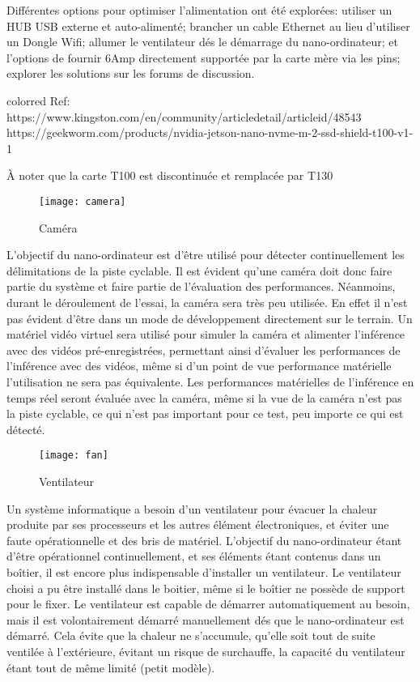 \par Différentes options pour optimiser l'alimentation ont été explorées: utiliser un HUB USB externe et auto-alimenté; brancher un cable Ethernet au lieu d'utiliser un Dongle Wifi; allumer le ventilateur dés le démarrage du nano-ordinateur; et l'options de fournir 6Amp directement supportée par la carte mère via les pins; explorer les solutions sur les forums de discussion. 
{color{red}
Ref: https://www.kingston.com/en/community/articledetail/articleid/48543
https://geekworm.com/products/nvidia-jetson-nano-nvme-m-2-ssd-shield-t100-v1-1
\par À noter que la carte T100 est discontinuée et remplacée par T130
}
\begin{figure}[H]
    \centering
    \texttt{[image: camera]}
    \caption{Caméra}
    \label{fig:camera}
\end{figure}
\par L'objectif du nano-ordinateur est d'être utilisé pour détecter continuellement les délimitations de la piste cyclable. Il est évident qu'une caméra doit donc faire partie du système et faire partie de l'évaluation des performances. Néanmoins, durant le déroulement de l'essai, la caméra sera très peu utilisée. En effet il n'est pas évident d'être dans un mode de développement directement sur le terrain. Un matériel vidéo virtuel sera utilisé pour simuler la caméra et alimenter l'inférence avec des vidéos pré-enregistrées, permettant ainsi d'évaluer les performances de l'inférence avec des vidéos, même si d'un point de vue performance matérielle l'utilisation ne sera pas équivalente. Les performances matérielles de l'inférence en temps réel seront évaluée avec la caméra, même si la vue de la caméra n'est pas la piste cyclable, ce qui n'est pas important pour ce test, peu importe ce qui est détecté.
\begin{figure}[H]
    \centering
    \texttt{[image: fan]}
    \caption{Ventilateur}
    \label{fig:fan}
\end{figure}
\par Un système informatique a besoin d'un ventilateur pour évacuer la chaleur produite par ses processeurs et les autres élément électroniques, et éviter une faute opérationnelle et des bris de matériel. L'objectif du nano-ordinateur étant d'être opérationnel continuellement, et ses éléments étant contenus dans un boîtier, il est encore plus indispensable d'installer un ventilateur. Le ventilateur choisi a pu être installé dans le boitier, même si le boîtier ne possède de support pour le fixer. Le ventilateur est capable de démarrer automatiquement au besoin, mais il est volontairement démarré manuellement dés que le nano-ordinateur est démarré. Cela évite que la chaleur ne s'accumule, qu'elle soit tout de suite ventilée à l'extérieure, évitant un risque de surchauffe, la capacité du ventilateur étant tout de même limité (petit modèle).

